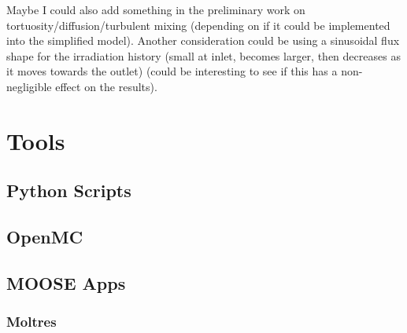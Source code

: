\documentclass[edeposit,fullpage,hidelinks]{uiucthesis2018}
\begin{document}
Maybe I could also add something in the preliminary work on tortuosity/diffusion/turbulent mixing (depending on if it could be implemented into the simplified model).
Another consideration could be using a sinusoidal flux shape for the irradiation history (small at inlet, becomes larger, then decreases as it moves towards the outlet) (could be interesting to see if this has a non-negligible effect on the results).

\section{Tools}





\subsection{Python Scripts}


\subsection{OpenMC}



\subsection{MOOSE Apps}





\subsubsection{Moltres}

\end{document}
